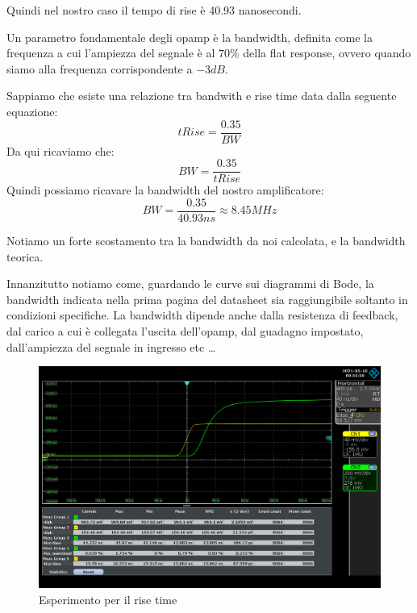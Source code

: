 Quindi nel nostro caso il tempo di rise è 40.93 nanosecondi.

Un parametro fondamentale degli opamp è la bandwidth, definita come la frequenza a cui l'ampiezza del segnale è al $70\%$ della flat response, ovvero quando siamo alla frequenza corrispondente a $-3 \si{dB}$.

Sappiamo che esiste una relazione tra bandwith e rise time data dalla seguente equazione:
\begin{displaymath}
tRise = \frac{0.35}{BW}
\end{displaymath}
Da qui ricaviamo che:
\begin{displaymath}
BW = \frac{0.35}{tRise}
\end{displaymath}
Quindi possiamo ricavare la bandwidth del nostro amplificatore:
\begin{displaymath}
BW = \frac{0.35}{40.93\si{ns}} \approx 8.45 \si{MHz}
\end{displaymath}

Notiamo un forte scostamento tra la bandwidth da noi calcolata, e la bandwidth teorica.

Innanzitutto notiamo come, guardando le curve sui diagrammi di Bode, la bandwidth indicata nella prima pagina del datasheet sia raggiungibile soltanto in condizioni specifiche.
La bandwidth dipende anche dalla resistenza di feedback, dal carico a cui è collegata l'uscita dell'opamp, dal guadagno impostato, dall'ampiezza del segnale in ingresso etc \dots

\begin{figure}[H]
\centering
\includegraphics[width=\textwidth]{assets/exp8/Screenshot_2021-05-10_0_085558.png}
\caption{Esperimento per il rise time}
\end{figure}





